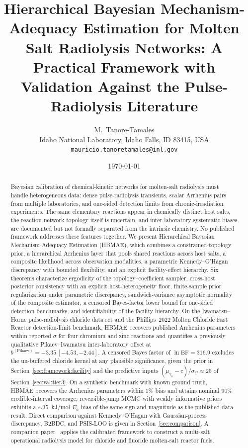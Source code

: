 \documentclass[12pt]{article}
\title{\bfseries Hierarchical Bayesian Mechanism-Adequacy Estimation for Molten Salt
       Radiolysis Networks: A Practical Framework with Validation Against the
       Pulse-Radiolysis Literature}
\author{M.\ Tanore-Tamales \\
        \small Idaho National Laboratory, Idaho Falls, ID 83415, USA \\
        \small \texttt{mauricio.tanoretamales@inl.gov}}
\date{\today}
\theoremstyle{plain}
\theoremstyle{definition}
\theoremstyle{remark}
\newcommand{\HBMAE}{HBMAE\xspace}
\begin{document}
\maketitle

\begin{abstract}
\noindent
Bayesian calibration of chemical-kinetic networks for molten-salt radiolysis
must handle heterogeneous data: dense pulse-radiolysis transients, scalar
Arrhenius pairs from multiple laboratories, and one-sided detection limits
from chronic-irradiation experiments.  The same elementary reactions appear
in chemically distinct host salts, the reaction-network topology itself is
uncertain, and inter-laboratory systematic biases are documented but not
formally separated from the intrinsic chemistry.  No published framework
addresses these features together.  We present Hierarchical Bayesian
Mechanism-Adequacy Estimation (\HBMAE), which combines a constrained-topology
prior, a hierarchical Arrhenius layer that pools shared reactions across host
salts, a composite likelihood across observation modalities, a parametric
Kennedy--O'Hagan discrepancy with bounded flexibility, and an explicit
facility-effect hierarchy.  Six theorems characterize ergodicity of the
topology--coefficient sampler, cross-host posterior consistency with an
explicit host-heterogeneity floor, finite-sample prior regularization under
parametric discrepancy, sandwich-variance asymptotic normality of the
composite estimator, a censored Bayes-factor lower bound for one-sided
detection benchmarks, and identifiability of the facility hierarchy.  On
the Iwamatsu--Horne pulse-radiolysis chloride data set and the
Phillips~2022 Molten Chloride Fast Reactor detection-limit benchmark,
\HBMAE\ recovers published Arrhenius parameters within reported $\sigma$
for four chromium and zinc reactions and quantifies a previously qualitative
Pikaev--Iwamatsu inter-laboratory offset at $b^{(\mathrm{Pikaev})} =
-3.35\,[-4.53,-2.44]$.  A censored Bayes factor of
$\ln\mathrm{BF}=316.9$ excludes the un-buffered chloride kernel at any
plausible significance, given the prior in
Section~\ref{sec:framework:facility} and the predictive inputs
$(\mu_{\gamma_0}-c)/\sigma_C\approx 25$ of
Section~\ref{sec:val:tier3}.  On a synthetic benchmark with known ground
truth, \HBMAE\ recovers the Arrhenius parameters within $1\%$ bias and
attains nominal $90\%$ credible-interval coverage; reversible-jump MCMC with
weakly informative priors exhibits a $\sim 35$~kJ/mol $E_a$ bias of the same
sign and magnitude as the published-data result.  Direct comparison against
Kennedy--O'Hagan with Gaussian-process discrepancy, B2BDC, and PSIS-LOO is
given in Section~\ref{sec:comparison}.  A companion
paper~\citep{Tanore2026PaperII} applies the calibrated framework to
construct a multi-salt operational radiolysis model for chloride and
fluoride molten-salt reactor fuels.
\end{abstract}
\end{document}
